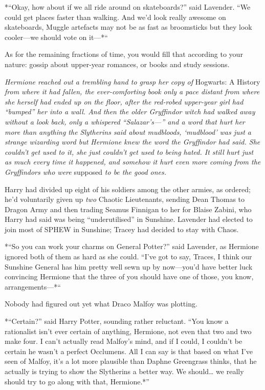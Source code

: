 *``Okay, how about if we all ride around on skateboards?'' said
Lavender. ``We could get places faster than walking. And we'd look
really awesome on skateboards, Muggle artefacts may not be as fast as
broomsticks but they look cooler---we should vote on it---*``

As for the remaining fractions of time, you would fill that according to
your nature: gossip about upper-year romances, or books and study
sessions.

\emph{Hermione reached out a trembling hand to grasp her copy of}
Hogwarts: A History \emph{from where it had fallen, the ever-comforting
book only a pace distant from where she herself had ended up on the
floor, after the red-robed upper-year girl had ``bumped'' her into a
wall. And then the older Gryffindor witch had walked away without a look
back, only a whispered ``Salazar's---'' and a word that hurt her more
than anything the Slytherins said about mudbloods, `mudblood' was just a
strange wizarding word but Hermione knew the word the Gryffindor had
said. She couldn't get used to it, she just couldn't get used to being
hated. It still hurt just as much every time it happened, and somehow it
hurt even more coming from the Gryffindors who were} supposed \emph{to
be the good ones.}

Harry had divided up eight of his soldiers among the other armies, as
ordered; he'd voluntarily given up \emph{two} Chaotic Lieutenants,
sending Dean Thomas to Dragon Army and then trading Seamus Finnigan to
her for Blaise Zabini, who Harry had said was being ``underutilised'' in
Sunshine. Lavender had elected to join most of SPHEW in Sunshine; Tracey
had decided to stay with Chaos.

*``So you can work your charms on General Potter?'' said Lavender, as
Hermione ignored both of them as hard as she could. ``I've got to say,
Traces, I think our Sunshine General has him pretty well sewn up by
now---you'd have better luck convincing Hermione that the three of you
should have one of those, you know, arrangements---*``

Nobody had figured out yet what Draco Malfoy was plotting.

*``Certain?'' said Harry Potter, sounding rather reluctant. ``You know a
rationalist isn't ever certain of anything, Hermione, not even that two
and two make four. I can't actually read Malfoy's mind, and if I could,
I couldn't be certain he wasn't a perfect Occlumens. All I can say is
that based on what I've seen of Malfoy, it's a lot more plausible than
Daphne Greengrass thinks, that he actually is trying to show the
Slytherins a better way. We should\ldots{} we really should try to go
along with that, Hermione.*''

